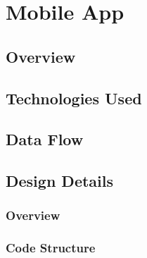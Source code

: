 
\section{Mobile App}

    \subsection{Overview}

    \subsection{Technologies Used}

    \subsection{Data Flow}

    \subsection{Design Details}

        \subsubsection{Overview}

        \subsubsection{Code Structure}


    